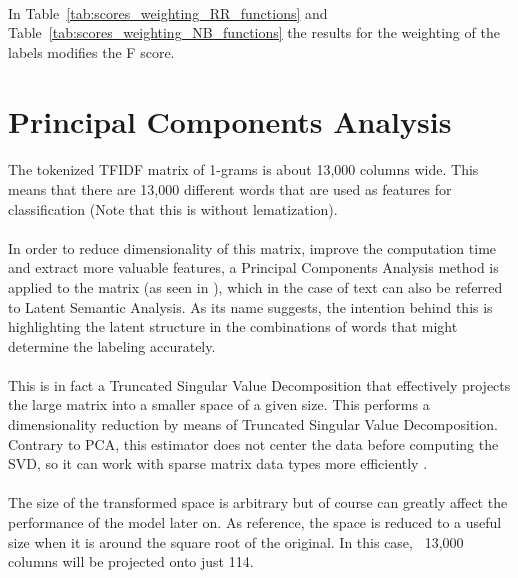 \documentclass[12pt,a4paper]{report}
\begin{document}
\paragraph{} In Table~\ref{tab:scores_weighting_RR_functions} and Table~\ref{tab:scores_weighting_NB_functions} the results for the weighting of the labels modifies the F score.

\section{Principal Components Analysis} 
\paragraph{} The tokenized TFIDF matrix of 1-grams is about 13,000 columns wide. This means that there are 13,000 different words that are used as features for classification (Note that this is without lematization).

\paragraph{} In order to reduce dimensionality of this matrix, improve the computation time and  extract more valuable features, a Principal Components Analysis method is applied  to the matrix (as seen in \cite{call_satisfaction}), which in the case of text can also be referred to Latent Semantic Analysis. As its name suggests, the intention behind this is highlighting the latent structure in the combinations of words that might determine the labeling accurately.

\paragraph{} This is in fact a Truncated Singular Value Decomposition that effectively projects the large matrix into a smaller space of a given size. This performs a dimensionality reduction by means of Truncated Singular Value Decomposition. Contrary to PCA, this estimator does not center the data before computing the SVD, so it can work with sparse matrix data types more efficiently \cite{scikit-learn1}.

\paragraph{} The size of the transformed space is arbitrary but of course can greatly affect the performance of the model later on. As reference, the space is reduced to a useful size when it is around the square root of the original. In this case, ~13,000 columns will be projected onto just 114.
\end{document}
